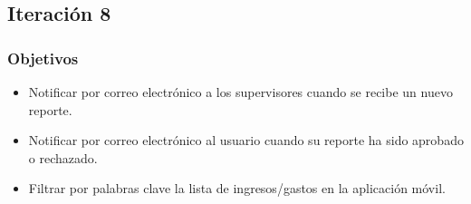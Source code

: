 %
%
%
%
%
%

\subsection{Iteración 8}

\subsubsection{Objetivos}
\begin{itemize}
\item Notificar por correo electrónico a los supervisores cuando se recibe un nuevo reporte.
\item Notificar por correo electrónico al usuario cuando su reporte ha sido aprobado o rechazado.
\item Filtrar por palabras clave la lista de ingresos/gastos en la aplicación móvil.
\end{itemize}
